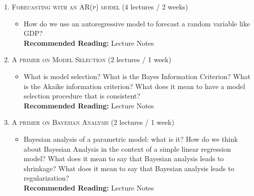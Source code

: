 \documentclass[12pt]{article} %
\numberwithin{equation}{section}
\theoremstyle{definition}
\newcommand{\0}{\textbf{0}}                          %
\begin{document}
\begin{enumerate}
\item {\scshape Forecasting with an AR(p) model} (4 lectures / 2 weeks)

\begin{itemize}
\item How do we use an autoregressive model to forecast a random variable like GDP?    \\

\textbf{Recommended Reading:} Lecture Notes \\
\end{itemize}

\item {\scshape A primer on Model Selection} (2 lectures / 1 week)

\begin{itemize}
\item What is model selection? What is the Bayes Information Criterion? What is the Akaike information criterion? What does it mean to have a model selection procedure that is consistent?   \\

\textbf{Recommended Reading:} Lecture Notes \\

\end{itemize}

 
\item {\scshape A primer on Bayesian Analysis} (2 lectures / 1 week)

\begin{itemize}
\item Bayesian analysis of a parametric model: what is it? How do we think about Bayesian Analysis in the context of a simple linear regression model? What does it mean to say that Bayesian analysis leads to shrinkage? What does it mean to say that Bayesian analysis leads to regularization?\\

\textbf{Recommended Reading:} Lecture Notes \\

\end{itemize}


\end{enumerate}


\newpage
\end{document}
